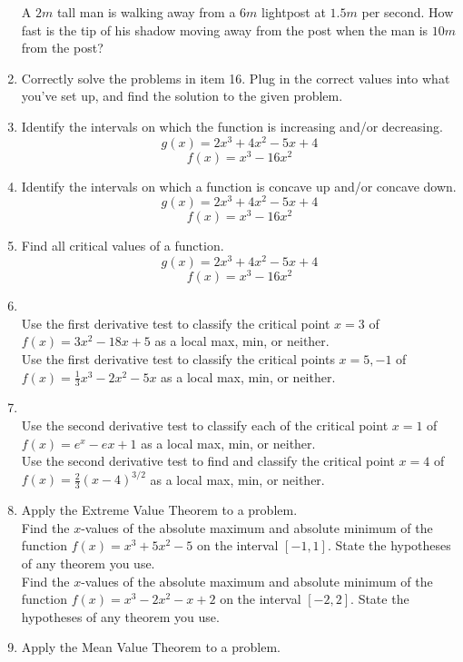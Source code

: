 \documentclass{exam}
\begin{document}
\begin{enumerate}
A $2m$ tall man is walking away from a $6m$ lightpost at $1.5m$ per second. How fast is the tip of his shadow moving away from the post when the man is $10m$ from the post?
\item Correctly solve the problems in item 16. Plug in the correct values into what you've set up, and find the solution to the given problem.
\item Identify the intervals on which the function is increasing and/or decreasing.\\
$$g(x) = 2x^3 + 4x^2 -5x + 4$$
$$f(x) = x^3 - 16x^2$$
\item Identify the intervals on which a function is concave up and/or concave down.\\
$$g(x) = 2x^3 + 4x^2 -5x + 4$$
$$f(x) = x^3 - 16x^2$$
\item Find all critical values of a function.\\
$$g(x) = 2x^3 + 4x^2 -5x + 4$$
$$f(x) = x^3 - 16x^2$$
\item \\
Use the first derivative test to classify the critical point $x = 3$ of $f(x) = 3x^2 - 18x + 5 $ as a local max, min, or neither.\\
Use the first derivative test to classify the critical points $x=5, -1$ of $f(x) = \frac{1}{3}x^3 - 2x^2 - 5x$ as a local max, min, or neither.
\item \\
Use the second derivative test to classify each of the critical point $x=1$ of $f(x) = e^x - ex + 1$ as a local max, min, or neither.\\
Use the second derivative test to find and classify the critical point $x=4$ of $f(x) = \frac{2}{3}(x-4)^{3/2}$ as a local max, min, or neither.
\item Apply the Extreme Value Theorem to a problem.\\
Find the $x$-values of the absolute maximum and absolute minimum of the function $f(x) =x^3 + 5x^2 - 5$ on the interval $[-1,1]$. State the hypotheses of any theorem you use.\\
Find the $x$-values of the absolute maximum and absolute minimum of the function $f(x) = x^3-2x^2-x+2$ on the interval $[-2,2]$. State the hypotheses of any theorem you use.
\item Apply the Mean Value Theorem to a problem.\\

\end{enumerate}
\end{document}
